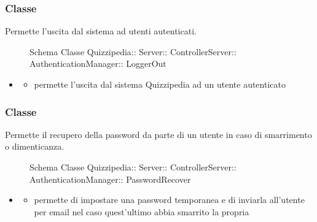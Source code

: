 \subsubsection{Classe }
Permette l'uscita dal sistema ad utenti autenticati.
\begin{figure}[H]
\centering
\noindent{}
\caption[Schema Classe LoggerOut]{Schema Classe Quizzipedia:: Server:: ControllerServer:: AuthenticationManager:: LoggerOut}
\end{figure}
\begin{itemize}
\item {}
\begin{itemize}
\item {}
\newline
permette l'uscita dal sistema Quizzipedia ad un utente autenticato
\newline
\end{itemize}
\end{itemize}
\subsubsection{Classe }
Permette il recupero della password da parte di un utente in caso di smarrimento o dimenticanza.
\begin{figure}[H]
\centering
\noindent{}
\caption[Schema Classe PasswordRecover]{Schema Classe Quizzipedia:: Server:: ControllerServer:: AuthenticationManager:: PasswordRecover}
\end{figure}
\begin{itemize}
\item {}
\begin{itemize}
\item {}
\newline
permette di impostare una password temporanea e di inviarla all'utente per email nel caso quest'ultimo abbia smarrito la propria
\newline
\end{itemize}
\end{itemize}
